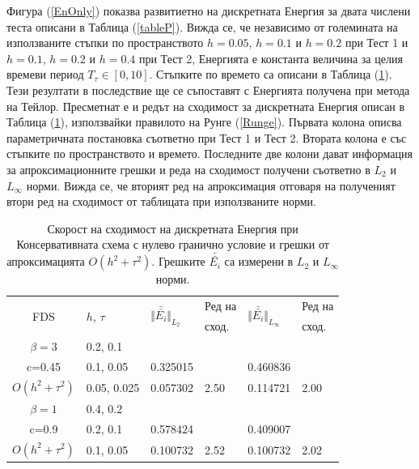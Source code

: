 \documentclass{article}
\newcommand{\rf}[1]{(\ref{#1})}
\begin{document}
Фигура \rf{EnOnly} показва развитиетно на дискретната Енергия за двата числени теста описани в Таблица \rf{tableP}. Вижда се, че независимо от големината на използваните стъпки по пространството $h = 0.05$, $h = 0.1$ и $h = 0.2$ при Тест 1 и $h = 0.1$, $h = 0.2$ и $h = 0.4$ при Тест 2, Енергията е константа величина за целия времеви период $T_{\tau} \in [0, 10]$. Стъпките по времето са описани в Таблица \rf{tableD}. Тези резултати в последствие ще се съпоставят с Енергията получена при метода на Тейлор. Пресметнат е и редът на сходимост за дискретната Енергия описан в Таблица \rf{tableD}, използвайки правилото на Рунге \rf{Runge}. Първата колона описва параметричната постановка съответно при Тест 1 и Тест 2. Втората колона е със стъпките по пространството и времето. Последните две колони дават информация за апроксимационните грешки и реда на сходимост получени съответно в $L_2$ и $L_\infty$ норми. Вижда се, че вторият ред на апроксимация отговаря на полученият втори ред на сходимост от таблицата при използваните норми.
\begin{table}[ht]
\centering
\small
		\begin{tabular}{||c|l|ll|ll||}
			\hline
			\hline
      \multirow{2  }{*}{FDS}        & \multirow{2  }{*}{$h$, $\tau$}  &  	\multirow{2  }{*}{ $\Vert \bar{\bar{ E_i}} \Vert_{L_2}$ }	&Ред на	& \multirow{2  }{*}{ $\Vert \bar{\bar{ E_i}} \Vert_{L_\infty}$ } 		&Ред на   \\
	                                        &                                                & 							 					&  сход. 	& 								       					& сход. \\
   			\hline 
					\hline 
  $\beta=3$                &0.2, 0.1         &                    &                &                  &                   \\
   c=0.45                     &0.1, 0.05         & 0.325015   &                & 0.460836  &                   \\
     $O(h^2 + \tau^ 2)$ &0.05, 0.025  & 0.057302   & 2.50       & 0.114721  & 2.00   \\
	   \hline
			\hline 
       $\beta=1$           & 0.4, 0.2       &                   &           &                 &   \\
                  c=0.9       & 0.2, 0.1        & 0.578424   &          &0.409007  &   \\
  $O(h^2+ \tau^2)$  & 0.1, 0.05       & 0.100732   & 2.52  &0.100732  & 2.02  \\
	   \hline
			\hline 
		\end{tabular}
		\caption{Скорост на сходимост на дискретната Енергия при Консервативната схема с нулево гранично условие и грешки от апроксимацията $O(h^{2} + \tau^2 )$. Грешките $\bar{\bar{ E_i}}$ са измерени в $L_2$ и $L_\infty$ норми.}
\label{tableD}
\end{table}
\end{document}
